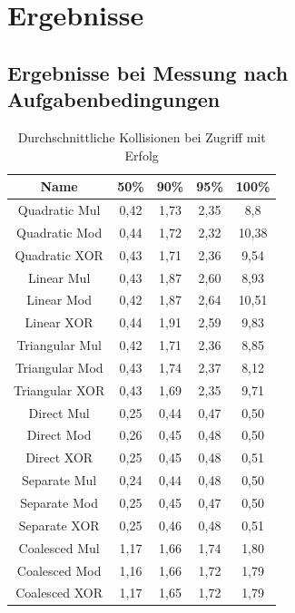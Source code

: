 \chapter{Ergebnisse}
\section{Ergebnisse bei Messung nach Aufgabenbedingungen}
\begin{table}[h!]
\begin{tabular}{c|cccc}
    Name & 50\% & 90\% & 95\% & 100\% \\
    \hline
    Quadratic Mul & 0,42 & 1,73 & 2,35 & 8,8 \\
    Quadratic Mod & 0,44 & 1,72 & 2,32 & 10,38 \\
    Quadratic XOR & 0,43 & 1,71 & 2,36 & 9,54 \\
    \hline
    Linear Mul & 0,43 & 1,87 & 2,60 & 8,93 \\
    Linear Mod & 0,42 & 1,87 & 2,64 & 10,51 \\
    Linear XOR & 0,44 & 1,91 & 2,59 & 9,83 \\
    \hline
    Triangular Mul & 0,42 & 1,71 & 2,36 & 8,85 \\
    Triangular Mod & 0,43 & 1,74 & 2,37 & 8,12 \\
    Triangular XOR & 0,43 & 1,69 & 2,35 & 9,71 \\
    \hline
    Direct Mul & 0,25 & 0,44 & 0,47 & 0,50 \\
    Direct Mod & 0,26 & 0,45 & 0,48 & 0,50 \\
    Direct XOR & 0,25 & 0,45 & 0,48 & 0,51 \\
    \hline
    Separate Mul & 0,24 & 0,44 & 0,48 & 0,50 \\
    Separate Mod & 0,25 & 0,45 & 0,47 & 0,50 \\
    Separate XOR & 0,25 & 0,46 & 0,48 & 0,51 \\
    \hline
    Coalesced Mul & 1,17 & 1,66 & 1,74 & 1,80 \\
    Coalesced Mod & 1,16 & 1,66 & 1,72 & 1,79 \\
    Coalesced XOR & 1,17 & 1,65 & 1,72 & 1,79 \\
\end{tabular}
\centering
\caption{Durchschnittliche Kollisionen bei Zugriff mit Erfolg}
\end{table}
